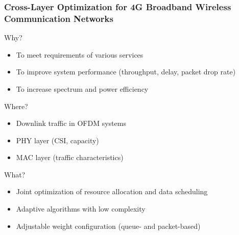 \documentclass{beamer}
\begin{document}
\begin{frame}
\frametitle{Cross-Layer Optimization for 4G Broadband Wireless Communication Networks}

\begin{block}{Why?}
\begin{itemize}
  \item To meet requirements of various services
  \item To improve system performance (throughput, delay, packet drop rate)
  \item To increase spectrum and power efficiency
\end{itemize}
\end{block}

\begin{block}{Where?}
\begin{itemize}
  \item Downlink traffic in OFDM systems
  \item PHY layer (CSI, capacity)
  \item MAC layer (traffic characteristics)
\end{itemize}
\end{block}

\begin{block}{What?}
\begin{itemize}
  \item Joint optimization of resource allocation and data scheduling
  \item Adaptive algorithms with low complexity
  \item Adjustable weight configuration (queue- and packet-based)
\end{itemize}
\end{block}

\end{frame}
\end{document}

